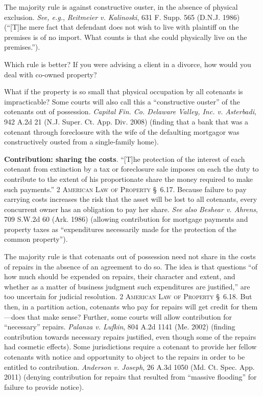 The majority rule is against constructive ouster, in the absence of physical
exclusion. \emph{See, e.g.}, \emph{Reitmeier v. Kalinoski}, 631 F. Supp. 565
(D.N.J.
1986) (``[T]he mere fact that defendant does not wish to live with plaintiff on
the premises is of no import. What counts is that she could physically live on
the premises.'').



Which rule is better? If you were advising a client in a divorce, how would you
deal with co-owned property?



What if the property is so small that physical occupation by all cotenants is
impracticable? Some courts will also call this a ``constructive ouster'' of
the cotenants out of possession. \emph{Capital Fin. Co. Delaware Valley, Inc. v.
Asterbadi}, 942 A.2d 21 (N.J. Super. Ct. App. Div. 2008) (finding that a bank
that was a cotenant through foreclosure with the wife of the defaulting
mortgagor was constructively ousted from a single-family home).



\item \textbf{Contribution: sharing the costs}.\term[contribution]{}
``[T]he protection of the
interest of each cotenant from extinction by a tax or foreclosure sale imposes
on each the duty to contribute to the extent of his proportionate share the
money required to make such payments.'' 2 \textsc{American Law of Property}
\S~6.17. Because failure to pay carrying costs increases the risk that the
asset will be lost to all cotenants, every concurrent owner has an obligation
to pay her share. \textit{See also} \emph{Beshear v. Ahrens}, 709 S.W.2d 60 (Ark.
1986) (allowing contribution for mortgage payments and property taxes as
``expenditures necessarily made for the protection of the common property'').


The majority rule is that cotenants out of possession need not share in the
costs of repairs in the absence of an agreement to do so. The idea is that
questions ``of how much should be expended on repairs, their character and
extent, and whether as a matter of business judgment such expenditures are
justified,'' are too uncertain for judicial resolution. 2 \textsc{American Law
of Property} \S~6.18. But then, in a partition action, cotenants who pay for
repairs will get credit for them---does that make sense? Further, some courts
will allow contribution for ``necessary'' repairs. \emph{Palanza v. Lufkin}, 804
A.2d 1141 (Me. 2002) (finding contribution towards necessary repairs justified,
even though some of the repairs had cosmetic effects). Some jurisdictions
require a cotenant to provide her fellow cotenants with notice and opportunity
to object to the repairs in order to be entitled to contribution. \emph{Anderson
v. Joseph}, 26 A.3d 1050 (Md. Ct. Spec. App. 2011) (denying contribution for
repairs that resulted from ``massive flooding'' for failure to provide notice).



